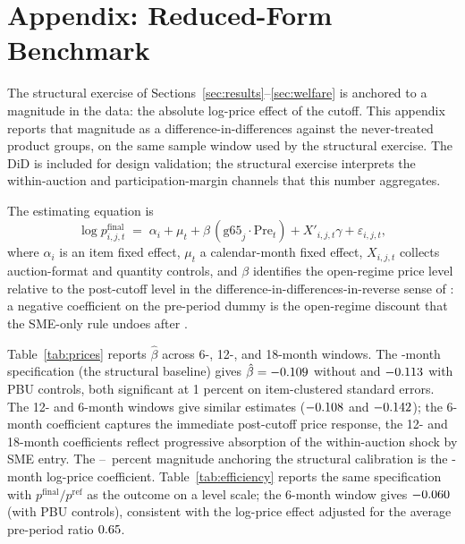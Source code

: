 \section{Appendix: Reduced-Form Benchmark}\label{app:did}

The structural exercise of Sections~\ref{sec:results}--\ref{sec:welfare} is anchored to a magnitude in the data: the absolute log-price effect of the \policyCutoffMonth{} cutoff. This appendix reports that magnitude as a difference-in-differences against the \controlGroupCount{} never-treated product groups, on the same sample window used by the structural exercise. The DiD is included for design validation; the structural exercise interprets the within-auction and participation-margin channels that this number aggregates.

The estimating equation is
\begin{equation}\label{eq:did}
\log p^{\mathrm{final}}_{i,j,t} \;=\; \alpha_i + \mu_t + \beta \, (\mathrm{g65}_j \cdot \text{Pre}_t) + X'_{i,j,t} \gamma + \varepsilon_{i,j,t},
\end{equation}
where $\alpha_i$ is an item fixed effect, $\mu_t$ a calendar-month fixed effect, $X_{i,j,t}$ collects auction-format and quantity controls, and $\beta$ identifies the open-regime price level relative to the post-cutoff level in the difference-in-differences-in-reverse sense of \citet{kim2019}: a negative coefficient on the pre-period dummy is the open-regime discount that the SME-only rule undoes after \policyCutoffMonth.



Table~\ref{tab:prices} reports $\hat\beta$ across 6-, 12-, and 18-month windows. The \structuralWindowM-month specification (the structural baseline) gives $\hat\beta = -0.109$ without and $-0.113$ with PBU controls, both significant at 1 percent on item-clustered standard errors. The 12- and 6-month windows give similar estimates ($-0.108$ and $-0.142$); the 6-month coefficient captures the immediate post-cutoff price response, the 12- and 18-month coefficients reflect progressive absorption of the within-auction shock by SME entry. The \didLowerPct--\didUpperPct~percent magnitude anchoring the structural calibration is the \structuralWindowM-month log-price coefficient. Table~\ref{tab:efficiency} reports the same specification with $p^{\mathrm{final}}/p^{\mathrm{ref}}$ as the outcome on a level scale; the 6-month window gives $-0.060$ (with PBU controls), consistent with the log-price effect adjusted for the average pre-period ratio $0.65$.

